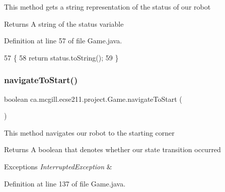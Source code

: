 This method gets a string representation of the status of our robot

\begin{DoxyReturn}{Returns}
A string of the status variable 
\end{DoxyReturn}


Definition at line 57 of file Game.\+java.


\begin{DoxyCode}
57                                     \{
58     \textcolor{keywordflow}{return} status.toString();
59   \}
\end{DoxyCode}
\mbox{\label{enumca_1_1mcgill_1_1ecse211_1_1project_1_1_game_a863962c648d0aaab59e870dea837780f}} 
\subsubsection{\texorpdfstring{navigate\+To\+Start()}{navigateToStart()}}
{\footnotesize\ttfamily boolean ca.\+mcgill.\+ecse211.\+project.\+Game.\+navigate\+To\+Start (\begin{DoxyParamCaption}{ }\end{DoxyParamCaption})}

This method navigates our robot to the starting corner

\begin{DoxyReturn}{Returns}
A boolean that denotes whether our state transition occurred 
\end{DoxyReturn}

\begin{DoxyExceptions}{Exceptions}
{\em Interrupted\+Exception} & \\
\hline
\end{DoxyExceptions}


Definition at line 137 of file Game.\+java.



